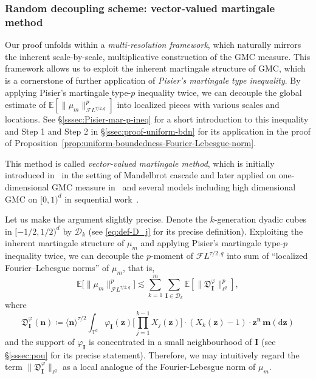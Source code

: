 \documentclass[12pt]{amsart}
\theoremstyle{definition}
\theoremstyle{remark}
\newcommand{\bz}{\boldsymbol{z}}
\newcommand{\E}{\mathbb{E}}
\newcommand{\T}{\mathbb{T}}
\numberwithin{equation}{section}
\begin{document}
\subsubsection{Random decoupling scheme: vector-valued martingale method}

Our proof unfolds within a \textit{multi-resolution framework}, which naturally mirrors the inherent scale-by-scale, multiplicative construction of the GMC measure. This framework allows us to exploit the inherent martingale structure of GMC, which is a cornerstone of further application of \textit{Pisier's martingale type inequality}. By applying Pisier's martingale type-$p$ inequality twice, we can decouple the global estimate of $\E[\|\mu_m\|_{\mathcal{F}L^{\tau/2,q}}^p]$ into localized pieces with various scales and locations. See \S\ref{sssec:Pisier-mar-p-ineq} for a short introduction to this inequality and Step 1 and Step 2 in \S\ref{ssec:proof-uniform-bdn} for its application in the proof of Proposition~\ref{prop:uniform-boundedness-Fourier-Lebesgue-norm}.

This method is called \textit{vector-valued martingale method}, which is initially introduced in~\cite{CHQW24} in the setting of Mandelbrot cascade and later applied on one-dimensional GMC measure in~\cite{LQT24} and several models including high dimensional GMC on $[0,1)^d$ in sequential work~\cite{LQT25}. 

Let us make the argument slightly precise. Denote the $k$-generation dyadic cubes in $[-1/2,1/2)^d$ by $\mathscr{D}_k$ (see \eqref{eq:def-D_j} for its precise definition). Exploiting the inherent martingale structure of $\mu_m$ and applying Pisier's martingale type-$p$ inequality twice, we can decouple the $p$-moment of $\mathcal{F}L^{\tau/2,q}$ into sum of ``localized Fourier--Lebesgue norms'' of $\mu_m$, that is,
\[
\mathbb{E}\big[\|\mu_m\|_{\mathcal{F}L^{\tau/2,q}}^p\big]\lesssim \sum_{k=1}^m \sum_{\boldsymbol{I}\in \mathscr{D}_k}\mathbb{E}[\|\mathfrak{D}_{\boldsymbol{I}}^\varphi\|_{\ell^q}^p],
\]
where
\begin{equation}\label{eq:intro-def-DIphi}
	\mathfrak{D}_{\boldsymbol{I}}^\varphi(\boldsymbol{n})\coloneq \langle \boldsymbol{n}\rangle^{\tau/2}\int_{\T^d}\varphi_{\boldsymbol{I}}(\bz)\bigg[\prod_{j=1}^{k-1}X_j(\bz)\bigg]\cdot(X_k(\bz)-1)\cdot \bz^{\boldsymbol{n}}\,\boldsymbol{m}(\mathrm{d}\bz)
\end{equation}
and the support of $\varphi_{\boldsymbol{I}}$ is concentrated in a small neighbourhood of $\boldsymbol{I}$ (see \S\ref{sssec:pou} for its precise statement). Therefore, we may intuitively regard the term $\|\mathfrak{D}_{\boldsymbol{I}}^\varphi\|_{\ell^q}$ as a local analogue of the Fourier-Lebesgue norm of $\mu_m$.
\end{document}
